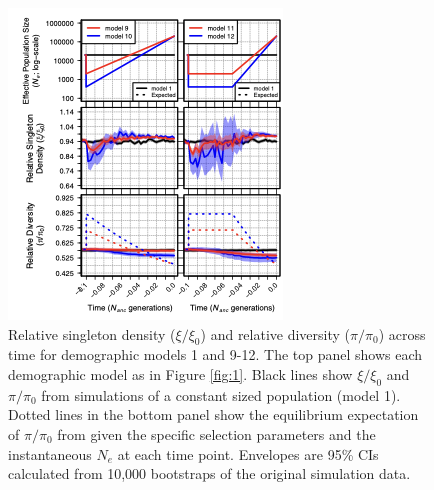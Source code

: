 \documentclass[9pt,twocolumn,twoside]{rilabRxiv}
\begin{document}
\begin{figure}[]
\includegraphics[width=\linewidth]{figures/figsup912.png}
\caption{Relative singleton density ($\xi/\xi_0$) and relative diversity ($\pi/\pi_0$) across time for demographic models 1 and 9-12.
The top panel shows each demographic model as in Figure \ref{fig:1}.
Black lines show $\xi/\xi_0$ and $\pi/\pi_0$ from simulations of a constant sized population (model 1).
Dotted lines in the bottom panel show the equilibrium  expectation of $\pi/\pi_0$ from  \citet{nordborg1996effect} given the specific selection parameters and the instantaneous $N_e$ at each time point.
Envelopes are 95\% CIs calculated from 10,000 bootstraps of the original simulation data.}
\label{fig:S912}
\end{figure}



\end{document}
